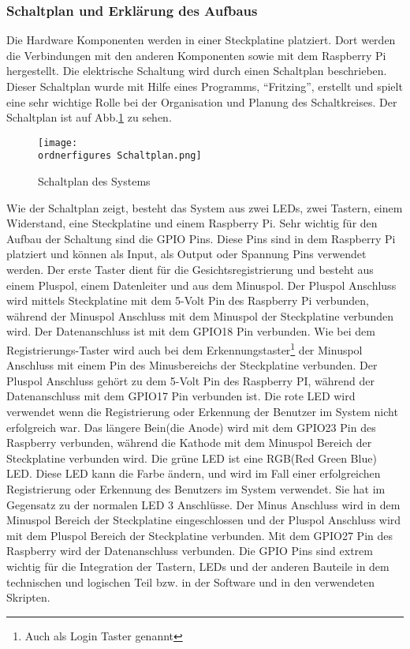 \subsubsection{Schaltplan und Erklärung des Aufbaus}
Die Hardware Komponenten werden in einer Steckplatine platziert. Dort werden die Verbindungen mit den anderen Komponenten sowie mit dem Raspberry Pi hergestellt. Die elektrische Schaltung wird durch einen Schaltplan beschrieben. Dieser Schaltplan wurde mit Hilfe eines Programms, ``Fritzing'', erstellt und spielt eine sehr wichtige Rolle bei der Organisation und Planung des Schaltkreises. Der Schaltplan ist auf Abb.\ref{fig:Schaltplan} zu sehen.
\begin{figure}[H]
	\texttt{[image: \\ordnerfigures Schaltplan.png]}
	\caption{Schaltplan des Systems}
	\label{fig:Schaltplan}
\end{figure}
Wie der Schaltplan zeigt, besteht das System aus zwei LEDs, zwei Tastern, einem Widerstand, eine Steckplatine und einem Raspberry Pi. Sehr wichtig für den Aufbau der Schaltung sind die GPIO Pins. Diese Pins sind in dem Raspberry Pi platziert und können als Input, als Output oder Spannung Pins verwendet werden. 
Der erste Taster dient für die Gesichtsregistrierung und besteht aus einem Pluspol, einem Datenleiter und aus dem Minuspol. Der Pluspol Anschluss wird mittels Steckplatine mit dem 5-Volt Pin des Raspberry Pi verbunden, während der Minuspol Anschluss mit dem Minuspol der Steckplatine verbunden wird. Der Datenanschluss ist mit dem GPIO18 Pin verbunden. Wie bei dem Registrierungs-Taster wird auch bei dem Erkennungstaster\footnote{Auch als Login Taster genannt} der Minuspol Anschluss mit einem Pin des Minusbereichs der Steckplatine verbunden. Der Pluspol Anschluss gehört zu dem 5-Volt Pin des Raspberry PI, während der Datenanschluss mit dem GPIO17 Pin verbunden ist. Die rote LED wird verwendet wenn die Registrierung oder Erkennung der Benutzer im System nicht erfolgreich war. Das längere Bein(die Anode) wird mit dem GPIO23 Pin des Raspberry verbunden, während die Kathode mit dem Minuspol Bereich der Steckplatine verbunden wird. Die grüne LED ist eine RGB(Red Green Blue) LED. Diese LED kann die Farbe ändern, und wird im Fall einer erfolgreichen Registrierung oder Erkennung des Benutzers im System verwendet. Sie hat im Gegensatz zu der normalen LED 3 Anschlüsse. Der Minus Anschluss wird in dem Minuspol Bereich der Steckplatine eingeschlossen und der Pluspol Anschluss wird mit dem Pluspol Bereich der Steckplatine verbunden. Mit dem GPIO27 Pin des Raspberry wird der Datenanschluss verbunden. Die GPIO Pins sind extrem wichtig für die Integration der Tastern, LEDs und der anderen Bauteile in dem technischen und logischen Teil bzw. in der Software und in den verwendeten Skripten.	
